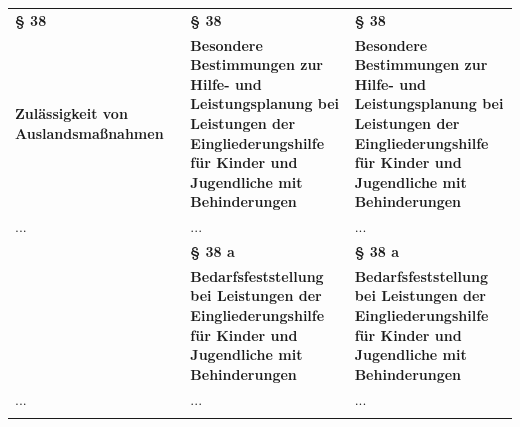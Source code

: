 \documentclass[10pt,a4paper,landscape]{article}
\begin{document}
\begin{longtable}{|L{8.2cm}|L{8.2cm}|L{8.2cm}|}
\textbf{\S{} 38} & \textbf{\S{} 38} & \textbf{\S{} 38} \\
\hhline{|---|}
\textbf{\textcolor{diffred}{Zulässigkeit von Auslandsmaßnahmen}} & \textbf{Besondere Bestimmungen zur Hilfe- und  \newline Leistungsplanung bei Leistungen der  \newline Eingliederungshilfe für Kinder und  \newline Jugendliche mit Behinderungen } & \textbf{Besondere Bestimmungen zur Hilfe- und  \newline Leistungsplanung bei Leistungen der  \newline Eingliederungshilfe für Kinder und  \newline Jugendliche mit Behinderungen } \\
\hhline{|---|}
... & ... & ... \\
\hhline{|---|}
 & \textbf{\S{} 38 a} & \textbf{\S{} 38 a} \\
\hhline{|---|}
 & \textbf{Bedarfsfeststellung bei Leistungen der  \newline Eingliederungshilfe für Kinder und  \newline Jugendliche mit Behinderungen } & \textbf{Bedarfsfeststellung bei Leistungen der  \newline Eingliederungshilfe für Kinder und  \newline Jugendliche mit Behinderungen } \\
\hhline{|---|}
... & ... & ... \\
\hhline{|---|}

\end{longtable}
\end{document}
